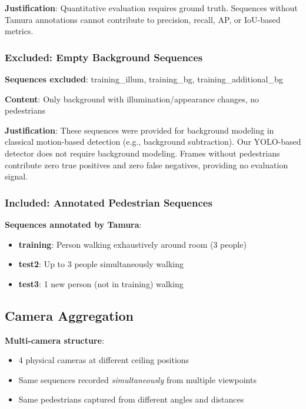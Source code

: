 \documentclass[11pt]{article}
\begin{document}
\textbf{Justification}: Quantitative evaluation requires ground truth. Sequences without Tamura annotations cannot contribute to precision, recall, AP, or IoU-based metrics.

\subsubsection{Excluded: Empty Background Sequences}

\textbf{Sequences excluded}: training\_illum, training\_bg, training\_additional\_bg

\textbf{Content}: Only background with illumination/appearance changes, no pedestrians

\textbf{Justification}: These sequences were provided for background modeling in classical motion-based detection (e.g., background subtraction). Our YOLO-based detector does not require background modeling. Frames without pedestrians contribute zero true positives and zero false negatives, providing no evaluation signal.

\subsubsection{Included: Annotated Pedestrian Sequences}

\textbf{Sequences annotated by Tamura}:
\begin{itemize}[leftmargin=*]
    \item \textbf{training}: Person walking exhaustively around room (3 people)
    \item \textbf{test2}: Up to 3 people simultaneously walking
    \item \textbf{test3}: 1 new person (not in training) walking
\end{itemize}

\subsection{Camera Aggregation}

\textbf{Multi-camera structure}:
\begin{itemize}[leftmargin=*]
    \item 4 physical cameras at different ceiling positions
    \item Same sequences recorded \textit{simultaneously} from multiple viewpoints
    \item Same pedestrians captured from different angles and distances
\end{itemize}
\end{document}
